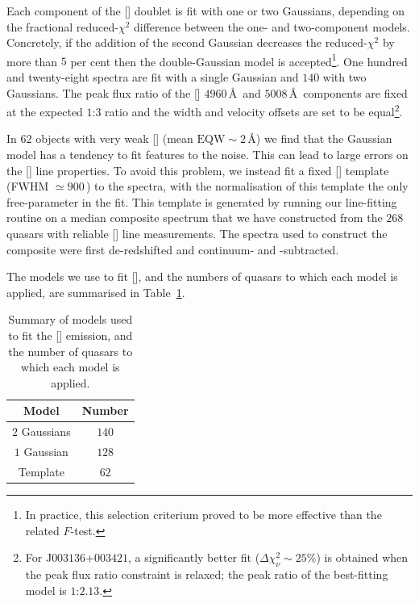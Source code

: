Each component of the [] doublet is fit with one or two Gaussians, depending on the fractional reduced-$\chi^2$ difference between the one- and two-component models.
Concretely, if the addition of the second Gaussian decreases the reduced-$\chi^2$ by more than $5$ per cent then the double-Gaussian model is accepted\footnote{In practice, this selection criterium proved to be more effective than the related $F$-test.}.
One hundred and twenty-eight spectra are fit with a single Gaussian and $140$ with two Gaussians.
The peak flux ratio of the [] $4960$\,\AA\, and $5008$\,\AA\, components are fixed at the expected $1$:$3$ ratio and the width and velocity offsets are set to be equal\footnote{For J$003136$+$003421$, a significantly better fit ($\Delta \chi^2_{\nu} \sim 25\%$) is obtained when the peak flux ratio constraint is relaxed; the peak ratio of the best-fitting model is $1$:$2.13$.}.

In $62$ objects with very weak [] (mean $\text{EQW}\sim2$\,\AA) we find that the Gaussian model has a tendency to fit features to the noise.
This can lead to large errors on the [] line properties.
To avoid this problem, we instead fit a fixed [] template (FWHM $\simeq900$\,\kms) to the spectra, with the normalisation of this template the only free-parameter in the fit.
This template is generated by running our line-fitting routine on a median composite spectrum that we have constructed from the $268$ quasars with reliable [] line measurements.
The spectra used to construct the composite were first de-redshifted and continuum- and -subtracted.

The models we use to fit [], and the numbers of quasars to which each model is applied, are summarised in Table~\ref{tab:oiiimod}.

\begin{table}
  \centering
  \footnotesize
    \begin{tabular}{cc}
    \hline
    Model & Number \\
    \hline
    $2$ Gaussians &  $140$ \\
    $1$ Gaussian  &  $128$ \\
    Template &  $62$ \\
    \hline
    \end{tabular}
    \caption[{Summary of models used to fit the [] emission, and the number of quasars to which each model is applied.}]{Summary of models used to fit the [] emission, and the number of quasars to which each model is applied.}
  \label{tab:oiiimod}
\end{table}

